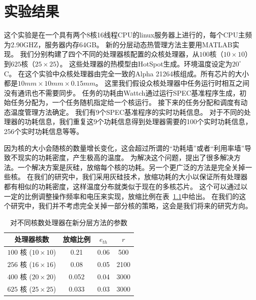 
\chapter{实验结果}\label{sec:exp}

这个实验是在一个具有两个8核16线程CPU的linux服务器上进行的，每个CPU主频为2.90GHZ，服务器内存64GB。
新的分层动态热管理方法主要用MATLAB实现。
我们分别构建了四个不同的处理器核配置的众核处理器，从$100$核（$10 \times 10$）到$625$核（$25 \times 25$）。
这些处理器的热模型由HotSpot生成。环境温度设定为$20^{\circ}$C。
在这个实验中众核处理器由完全一致的Alpha 21264核组成。所有芯片的大小都是$10mm \times 10mm \times 0.15mm$。
这里我们假设众核处理器中任务运行时相互之间没有通讯也不需要同步。
任务的功耗由Wattch通过运行SPEC基准程序生成，初始任务分配为，一个任务随机指定给一个核运行。
接下来的任务分配和调度有动态温度管理方法确定。
我们有9个SPEC基准程序的实时功耗信息。
对于不同的处理器的功耗信息，我们重复这9个功耗信息得到处理器需要的100个实时功耗信息，256个实时功耗信息等等。

因为核的大小会随核的数量增长变化，这会超过所谓的“功耗墙”或者“利用率墙”导致不现实的功耗密度，产生极高的温度。
为解决这个问题，提出了很多解决方法。一个解决方案是灰硅，放缩每个核的功耗。另一个更广泛的方法是完全关掉一些核\cite{Taylor:MICRO'13,Shafique:DAC'14}。
在我们的研究中，我们采用灰硅技术，放缩功耗的大小以保证所有处理器都有相似的功耗密度，这样温度分布就类似于现在的多核芯片。
这个可以通过以一定的比例调整操作频率和电压来实现，放缩比例在表~\ref{tab:param}中给出。
在我们的这个研究中，我们并不考虑完全关掉一部分核的策略，这会是我们将来的研究方向。
\begin{table}[H]
\centering
 \begin{tabular}{|c|c|c|c|}
 \hline
 \hline
 处理器核数 &  放缩比例 & $e_{th}$ & $r$ \\
 \hline 
 \hline
 $100$ 核 ($10 \times 10$) & 0.21 & 0.06 & 500  \\
 \hline
 $256$ 核 ($16 \times 16$) & 0.08 & 0.05 & 2100 \\
 \hline
 $400$ 核 ($20 \times 20$) & 0.052 & 0.04 & 3000 \\
 \hline
 $625$ 核 ($25 \times 25$) & 0.033 & 0.03 & 3000 \\
 \hline
 \hline
 \end{tabular}
 \caption{对不同核数处理器在新分层方法的参数}\label{tab:param}
 \end{table}
 
